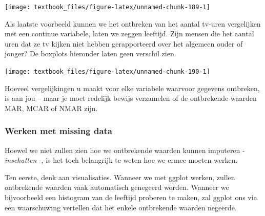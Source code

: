 \documentclass[]{tufte-book}
\newenvironment{Shaded}{}{}
\newcommand{\DataTypeTok}[1]{\textcolor[rgb]{0.56,0.13,0.00}{#1}}
\newcommand{\DecValTok}[1]{\textcolor[rgb]{0.25,0.63,0.44}{#1}}
\newcommand{\KeywordTok}[1]{\textcolor[rgb]{0.00,0.44,0.13}{\textbf{#1}}}
\newcommand{\NormalTok}[1]{#1}
\newcommand{\OperatorTok}[1]{\textcolor[rgb]{0.40,0.40,0.40}{#1}}
\newcommand{\StringTok}[1]{\textcolor[rgb]{0.25,0.44,0.63}{#1}}
\begin{document}
\texttt{[image: textbook\_files/figure-latex/unnamed-chunk-189-1]}

Als laatste voorbeeld kunnen we het ontbreken van het aantal tv-uren vergelijken met een continue variabele, laten we zeggen leeftijd. Zijn mensen die het aantal uren dat ze tv kijken niet hebben gerapporteerd over het algemeen ouder of jonger? De boxplots hieronder laten geen verschil zien.

\begin{Shaded}
\end{Shaded}

\texttt{[image: textbook\_files/figure-latex/unnamed-chunk-190-1]}

Hoeveel vergelijkingen u maakt voor elke variabele waarvoor gegevens ontbreken, is aan jou -- maar je moet redelijk bewijs verzamelen of de ontbrekende waarden MAR, MCAR of NMAR zijn.

\hypertarget{werken-met-missing-data}{%
\subsubsection{Werken met missing data}\label{werken-met-missing-data}}

Hoewel we niet zullen zien hoe we ontbrekende waarden kunnen imputeren - \emph{inschatten} -, is het toch belangrijk te weten hoe we ermee moeten werken.

Ten eerste, denk aan visualisaties. Wanneer we met ggplot werken, zullen ontbrekende waarden vaak automatisch genegeerd worden. Wanneer we bijvoorbeeld een histogram van de leeftijd proberen te maken, zal ggplot ons via een waarschuwing vertellen dat het enkele ontbrekende waarden negeerde.

\begin{Shaded}
\end{Shaded}
\end{document}
